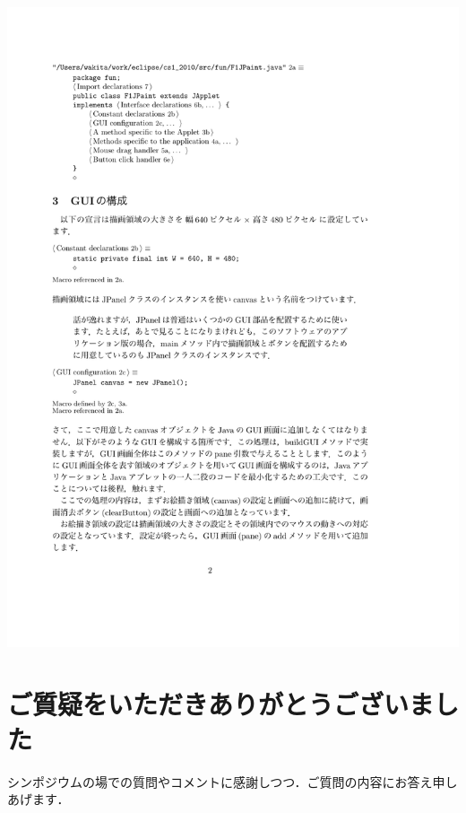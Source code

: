 \documentclass [11pt] {jsarticle}
\newcommand\Section[1]{\newpage \section {#1}}
\begin{document}
\centerline {\includegraphics [scale=.85] {figs/F1JPaint.pdf}}



\Section {ご質疑をいただきありがとうございました}

シンポジウムの場での質問やコメントに感謝しつつ．ご質問の内容にお答え申しあげます．
\end{document}
